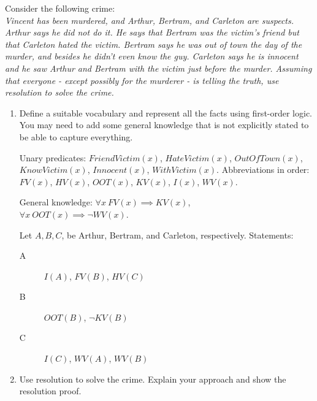\documentclass[12pt]{article}
\newenvironment{problem}[2][Problem]{\begin{trivlist}
\item[\hskip \labelsep {\bfseries #1}\hskip \labelsep {\bfseries #2.}]}{\end{trivlist}}
\begin{document}
\begin{problem}{5}
	Consider the following crime: \\
	\textit{
		Vincent has been murdered, and Arthur, Bertram, and Carleton are suspects.
		Arthur says he did not do it.
		He says that Bertram was the victim's friend but that Carleton hated the victim.
		Bertram says he was out of town the day of the murder, and besides he didn't even know the guy.
		Carleton says he is innocent and he saw Arthur and Bertram with the victim just before the murder.
		Assuming that everyone - except possibly for the murderer - is telling the truth,
		use resolution to solve the crime.
	}
	\begin{enumerate}
		\item Define a suitable vocabulary and represent all the facts using first-order logic.
			You may need to add some general knowledge that is not explicitly stated to be able to
			capture everything.

			\vspace{0.25cm}
			Unary predicates: $FriendVictim(x)$, $HateVictim(x)$, $OutOfTown(x)$, $KnowVictim(x)$,
			$Innocent(x)$, $WithVictim(x)$.
			Abbreviations in order: $FV(x)$, $HV(x)$, $OOT(x)$, $KV(x)$, $I(x)$, $WV(x)$.

			General knowledge: $\forall x ~ FV(x) \implies KV(x)$, \\
			$\forall x ~ OOT(x) \implies \neg WV(x)$.

			Let $A,B,C$, be Arthur, Bertram, and Carleton, respectively.
			Statements:
			\begin{description}
				\item[A] $I(A)$, $FV(B)$, $HV(C)$
				\item[B] $OOT(B)$, $\neg KV(B)$
				\item[C] $I(C)$, $WV(A)$, $WV(B)$
			\end{description}
		\item Use resolution to solve the crime.
			Explain your approach and show the resolution proof.


\end{enumerate}
\end{problem}
\end{document}
